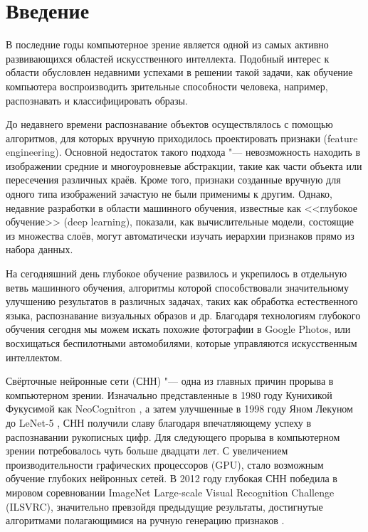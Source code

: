 \section{Введение}
В последние годы компьютерное зрение является одной из самых активно развивающихся областей
искусственного интеллекта. Подобный интерес к области обусловлен недавними успехами в решении
такой задачи, как обучение компьютера воспроизводить зрительные способности человека, например,
распознавать и классифицировать образы.

До недавнего времени распознавание объектов осуществлялось с помощью 
алгоритмов, для которых вручную приходилось проектировать признаки (feature engineering). 
Основной недостаток такого подхода "--- невозможность находить в изображении 
средние и многоуровневые абстракции, такие как части объекта или пересечения различных краёв. 
Кроме того, признаки созданные вручную для одного типа изображений зачастую не были применимы к 
другим. Однако, недавние разработки в области машинного обучения, известные как <<глубокое 
обучение>> (deep learning), показали, как вычислительные модели, состоящие из множества слоёв, 
могут автоматически изучать иерархии признаков прямо из набора данных.

На сегодняшний день глубокое обучение развилось и укрепилось в отдельную ветвь машинного обучения, 
алгоритмы которой способствовали значительному улучшению результатов в различных задачах, таких как 
обработка естественного языка, распознавание визуальных образов и др. Благодаря технологиям 
глубокого обучения сегодня мы можем искать похожие фотографии в Google Photos, или восхищаться 
беспилотными автомобилями, которые управляются искусственным интеллектом.

Свёрточные нейронные сети (СНН) "--- одна из главных причин прорыва в компьютерном зрении. 
Изначально представленные в 1980 году Кунихикой Фукусимой как NeoCognitron \cite{Neocognitron}, а 
затем улучшенные в 1998 году Яном Лекуном до LeNet-5 \cite{lecun-98}, СНН получили славу благодаря 
впечатляющему успеху в  распознавании рукописных цифр. Для следующего прорыва в компьютерном зрении 
потребовалось чуть больше двадцати лет. С увеличением производительности графических процессоров 
(GPU), стало возможным обучение глубоких нейронных сетей. В 2012 году глубокая СНН победила в 
мировом соревновании ImageNet Large-scale Visual Recognition Challenge (ILSVRC), значительно 
превзойдя предыдущие результаты, достигнутые алгоритмами полагающимися на ручную генерацию 
признаков \cite{NIPS2012_4824}.

